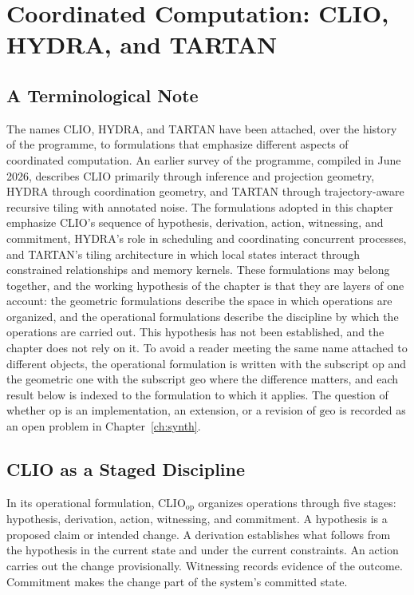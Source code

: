 \documentclass[11pt,twoside,openright]{book}
\theoremstyle{plain}
\theoremstyle{definition}
\theoremstyle{remark}
\begin{document}
\chapter{Coordinated Computation: CLIO, HYDRA, and TARTAN}
\label{ch:coord}

\section{A Terminological Note}

The names CLIO, HYDRA, and TARTAN have been attached, over the history of the programme, to formulations that emphasize different aspects of coordinated computation. An earlier survey of the programme, compiled in June 2026, describes CLIO primarily through inference and projection geometry, HYDRA through coordination geometry, and TARTAN through trajectory-aware recursive tiling with annotated noise. The formulations adopted in this chapter emphasize CLIO's sequence of hypothesis, derivation, action, witnessing, and commitment, HYDRA's role in scheduling and coordinating concurrent processes, and TARTAN's tiling architecture in which local states interact through constrained relationships and memory kernels. These formulations may belong together, and the working hypothesis of the chapter is that they are layers of one account: the geometric formulations describe the space in which operations are organized, and the operational formulations describe the discipline by which the operations are carried out. This hypothesis has not been established, and the chapter does not rely on it. To avoid a reader meeting the same name attached to different objects, the operational formulation is written with the subscript $\mathrm{op}$ and the geometric one with the subscript $\mathrm{geo}$ where the difference matters, and each result below is indexed to the formulation to which it applies. The question of whether $\mathrm{op}$ is an implementation, an extension, or a revision of $\mathrm{geo}$ is recorded as an open problem in Chapter~\ref{ch:synth}.

\section{CLIO as a Staged Discipline}

In its operational formulation, CLIO$_{\mathrm{op}}$ organizes operations through five stages: hypothesis, derivation, action, witnessing, and commitment. A hypothesis is a proposed claim or intended change. A derivation establishes what follows from the hypothesis in the current state and under the current constraints. An action carries out the change provisionally. Witnessing records evidence of the outcome. Commitment makes the change part of the system's committed state.
\end{document}
